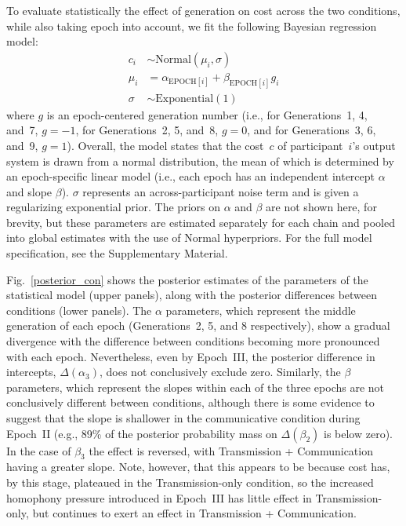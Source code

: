 \documentclass[doc,biblatex]{apa7}
\begin{document}
To evaluate statistically the effect of generation on cost across the two conditions, while also taking epoch into account, we fit the following Bayesian regression model:
	\begin{align*}
	   c_i & \sim \mathrm{Normal}(\mu_i, \sigma) \\
	 \mu_i & =    \alpha_{\mathrm{EPOCH}[i]} + \beta_{\mathrm{EPOCH}[i]} g_i \\
	\sigma & \sim \mathrm{Exponential}(1)
	\end{align*}
where $g$ is an epoch-centered generation number (i.e., for Generations~1, 4, and~7, $g=-1$, for Generations~2, 5, and~8, $g=0$, and for Generations~3, 6, and~9, $g=1$). Overall, the model states that the cost~$c$ of participant~$i$'s output system is drawn from a normal distribution, the mean of which is determined by an epoch-specific linear model (i.e., each epoch has an independent intercept $\alpha$ and slope $\beta$). $\sigma$ represents an across-participant noise term and is given a regularizing exponential prior. The priors on $\alpha$ and $\beta$ are not shown here, for brevity, but these parameters are estimated separately for each chain and pooled into global estimates with the use of Normal hyperpriors. For the full model specification, see the Supplementary Material.

Fig.~\ref{posterior_con} shows the posterior estimates of the parameters of the statistical model (upper panels), along with the posterior differences between conditions (lower panels). The $\alpha$ parameters, which represent the middle generation of each epoch (Generations~2, 5, and 8 respectively), show a gradual divergence with the difference between conditions becoming more pronounced with each epoch. Nevertheless, even by Epoch~III, the posterior difference in intercepts, $\Delta(\alpha_3)$, does not conclusively exclude zero. Similarly, the $\beta$ parameters, which represent the slopes within each of the three epochs are not conclusively different between conditions, although there is some evidence to suggest that the slope is shallower in the communicative condition during Epoch~II (e.g., 89\% of the posterior probability mass on $\Delta(\beta_2)$ is below zero). In the case of $\beta_3$ the effect is reversed, with Transmission + Communication having a greater slope. Note, however, that this appears to be because cost has, by this stage, plateaued in the Transmission-only condition, so the increased homophony pressure introduced in Epoch~III has little effect in Transmission-only, but continues to exert an effect in Transmission + Communication.
\end{document}
